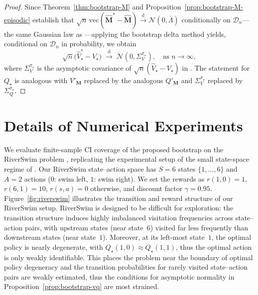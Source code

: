 \documentclass{article}
\numberwithin{equation}{section}
\begin{document}
\begin{proof}
Since Theorem~\ref{thm:bootstrap-M} and Proposition~\ref{prop:bootstrap-M-episodic} establish that
$\sqrt{n}\,\mathrm{vec}(\hat{\mathbf{M}}^\ast-\hat{\mathbf{M}})\xrightarrow{\mathrm{d}}\mathcal{N}(0,\bar\Lambda)$ conditionally on $\mathcal{D}_n$---the same Gaussian law
as \citet[Corollary~1]{su2025centrallimittheoremstransition}---applying the bootstrap delta method yields,
conditional on $\mathcal{D}_n$ in probability, we obtain
\[
\sqrt{n}\bigl(\hat V_\star^\ast - \hat V_\star\bigr) \;\xrightarrow{\mathrm{d}}\;
\mathcal{N}(0,\Sigma_V^{\pi_\star}), \quad\text{as } n\to\infty,
\]
where $\Sigma_V^{\pi_\star}$ is the asymptotic covariance of $\sqrt{n}(\hat V_\star - V_\star)$ in
\citet[Theorem~3]{su2025centrallimittheoremstransition}. 
The statement for $Q_\star$ is analogous with $V'_\mathbf{M}$ replaced by the analogous $Q'_\mathbf{M}$ and $\Sigma_V^{\pi_\star}$ replaced by $\Sigma_Q^{\pi_\star}$.
\qedhere
\end{proof}

\clearpage
\section{Details of Numerical Experiments}
\label{app:tables}

We evaluate finite-sample CI coverage of the proposed bootstrap on the RiverSwim problem \citep{strehl2004empirical}, replicating the experimental setup of the small state-space regime of \citet{zhu2024uncertainty}.
Our RiverSwim state--action space has $S=6$ states $\{1,\ldots,6\}$ and $A=2$ actions ($0$: swim left, $1$: swim right).
We set the rewards as $r(1,0)=1$, $r(6,1)=10$, $r(s,a)=0$ otherwise, and discount factor $\gamma=0.95$.
Figure~\ref{fig:riverswim} illustrates the transition and reward structure of our RiverSwim setup.
RiverSwim is designed to be difficult for exploration: the transition structure induces highly imbalanced visitation frequencies across state--action pairs, with upstream states (near state~$6$) visited far less frequently than downstream states (near state~$1$).
Moreover, at its left-most state~$1$, the optimal policy is nearly degenerate, with $Q_\star(1,0)\approx Q_\star(1,1)$, thus the optimal action is only weakly identifiable.
This places the problem near the boundary of optimal policy degeneracy and the transition probabilities for rarely visited state--action pairs are weakly estimated, thus the conditions for asymptotic normality in Proposition~\ref{prop:bootstrap-vq} are most strained.
\end{document}

